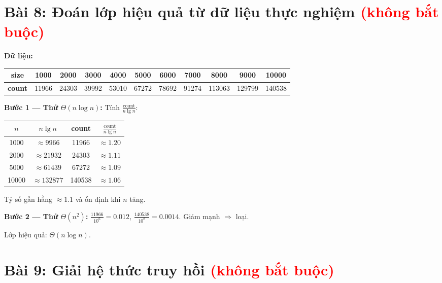 \documentclass[12pt,a4paper]{article}
\begin{document}
\newpage
\section{Bài 8: Đoán lớp hiệu quả từ dữ liệu thực nghiệm {\small\textcolor{red}{(không bắt buộc)}}}

\textbf{Dữ liệu:}
\begin{center}
\renewcommand{\arraystretch}{1.1}
\begin{tabular}{|c|c|c|c|c|c|c|c|c|c|c|}
\hline
\textbf{size} & 1000 & 2000 & 3000 & 4000 & 5000 & 6000 & 7000 & 8000 & 9000 & 10000 \\
\hline
\textbf{count} & 11966 & 24303 & 39992 & 53010 & 67272 & 78692 & 91274 & 113063 & 129799 & 140538 \\
\hline
\end{tabular}
\end{center}

\textbf{Bước 1 --- Thử $\Theta(n\log n)$:} Tính $\frac{\text{count}}{n\lg n}$:

\begin{center}
\begin{tabular}{|c|c|c|c|}
\hline
$n$ & $n\lg n$ & count & $\frac{\text{count}}{n\lg n}$ \\
\hline
1000 & $\approx 9966$ & 11966 & $\approx 1.20$ \\
2000 & $\approx 21932$ & 24303 & $\approx 1.11$ \\
5000 & $\approx 61439$ & 67272 & $\approx 1.09$ \\
10000 & $\approx 132877$ & 140538 & $\approx 1.06$ \\
\hline
\end{tabular}
\end{center}

Tỷ số gần hằng $\approx 1.1$ và ổn định khi $n$ tăng. \checkmark

\textbf{Bước 2 --- Thử $\Theta(n^2)$:} $\frac{11966}{10^6} = 0.012$, $\frac{140538}{10^8} = 0.0014$. Giảm mạnh $\Rightarrow$ loại.

\begin{resultbox}
Lớp hiệu quả: $\Theta(n\log n)$.
\end{resultbox}

\newpage
\section{Bài 9: Giải hệ thức truy hồi {\small\textcolor{red}{(không bắt buộc)}}}
\end{document}

